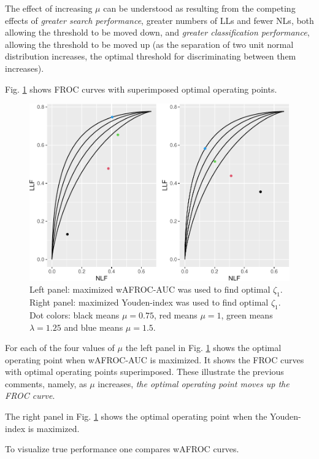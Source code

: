 \documentclass[
]{book}
\begin{document}
The effect of increasing \(\mu\) can be understood as resulting from the competing effects of \emph{greater search performance}, greater numbers of LLs and fewer NLs, both allowing the threshold to be moved down, and \emph{greater classification performance}, allowing the threshold to be moved up (as the separation of two unit normal distribution increases, the optimal threshold for discriminating between them increases).

Fig. \ref{fig:optim-op-point-vary-mu} shows FROC curves with superimposed optimal operating points.

\begin{figure}
\centering
\includegraphics{21-optim-op-point_files/figure-latex/optim-op-point-vary-mu-1.pdf}
\caption{\label{fig:optim-op-point-vary-mu}Left panel: maximized wAFROC-AUC was used to find optimal \(\zeta_1\). Right panel: maximized Youden-index was used to find optimal \(\zeta_1\). Dot colors: black means \(\mu = 0.75\), red means \(\mu = 1\), green means \(\lambda = 1.25\) and blue means \(\mu = 1.5\).}
\end{figure}

For each of the four values of \(\mu\) the left panel in Fig. \ref{fig:optim-op-point-vary-mu} shows the optimal operating point when wAFROC-AUC is maximized. It shows the FROC curves with optimal operating points superimposed. These illustrate the previous comments, namely, as \(\mu\) increases, \emph{the optimal operating point moves up the FROC curve}.

The right panel in Fig. \ref{fig:optim-op-point-vary-mu} shows the optimal operating point when the Youden-index is maximized.

To visualize true performance one compares wAFROC curves.
\end{document}
